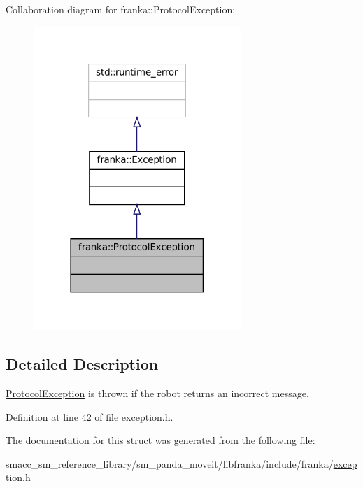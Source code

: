 Collaboration diagram for franka\+:\+:Protocol\+Exception\+:
\nopagebreak
\begin{figure}[H]
\begin{center}
\leavevmode
\includegraphics[width=222pt]{structfranka_1_1ProtocolException__coll__graph}
\end{center}
\end{figure}


\subsection{Detailed Description}
\hyperlink{structfranka_1_1ProtocolException}{Protocol\+Exception} is thrown if the robot returns an incorrect message. 

Definition at line 42 of file exception.\+h.



The documentation for this struct was generated from the following file\+:\begin{DoxyCompactItemize}
\item 
smacc\+\_\+sm\+\_\+reference\+\_\+library/sm\+\_\+panda\+\_\+moveit/libfranka/include/franka/\hyperlink{exception_8h}{exception.\+h}\end{DoxyCompactItemize}
